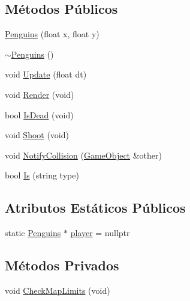 \subsection*{Métodos Públicos}
\begin{DoxyCompactItemize}
\item 
\hyperlink{classPenguins_ac87a9d6a759c4870594a167e005aae9e}{Penguins} (float x, float y)
\item 
\hyperlink{classPenguins_a685a9c6e30a94476d4dadc8bcf845211}{$\sim$\+Penguins} ()
\item 
void \hyperlink{classPenguins_a63b378e640cd3a76cbe6afaf0c6578d7}{Update} (float dt)
\item 
void \hyperlink{classPenguins_a5af1c983add97265c7491d17d2dc019e}{Render} (void)
\item 
bool \hyperlink{classPenguins_ab76c07904df3da2d768f08eb3da3d1e0}{Is\+Dead} (void)
\item 
void \hyperlink{classPenguins_a20b86d9efb0eee5169658bc57f6fc61b}{Shoot} (void)
\item 
void \hyperlink{classPenguins_aba0e8bc9309f056d196cd0fd267fbe78}{Notify\+Collision} (\hyperlink{classGameObject}{Game\+Object} \&other)
\item 
bool \hyperlink{classPenguins_a73a0c4f96de975d6219b4d6016fac29e}{Is} (string type)
\end{DoxyCompactItemize}
\subsection*{Atributos Estáticos Públicos}
\begin{DoxyCompactItemize}
\item 
static \hyperlink{classPenguins}{Penguins} $\ast$ \hyperlink{classPenguins_a7d530cec6ba98b902c6120a90d574c0f}{player} = nullptr
\end{DoxyCompactItemize}
\subsection*{Métodos Privados}
\begin{DoxyCompactItemize}
\item 
void \hyperlink{classPenguins_a5f1be8c9d5de19d15b3bbcf12e224956}{Check\+Map\+Limits} (void)
\end{DoxyCompactItemize}
